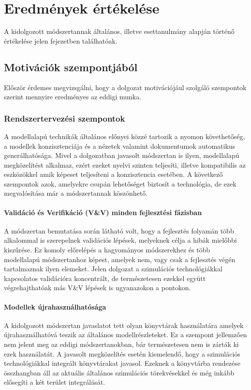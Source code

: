 \chapter{Eredmények értékelése}
A kidolgozott módszertannak általános, illetve esettanulmány alapján történő értékelése jelen fejezetben találhatóak.

    \section{Motivációk szempontjából}
    Először érdemes megvizsgálni, hogy a dolgozat motivációjául szolgáló szempontok szerint mennyire eredményes az eddigi munka.

        \subsection{Rendszertervezési szempontok}
        A modellalapú technikák általános előnyei közzé tartozik a nyomon követhetőség, a modellek konzisztenciája és a nézetek valamint dokumentumok automatikus generálhatósága.
        Mivel a dolgozatban javasolt módszertan is ilyen, modellalapú megközelítést alkalmaz, ezért ezeket nyelvi szinten teljesíti, illetve kompatibilis az eszközökkel amik képeset teljesíteni a konzisztencia esetében.
        A következő szempontok azok, amelyekre csupán lehetőséget biztosít a technológia, de ezek megvalósítása már a módszertannak köszönhető.

            \subsubsection{Validáció és Verifikáció (V\&V) minden fejlesztési fázisban} \label{ertekelesVV}
            A módszertan bemutatása során látható volt, hogy a fejlesztés folyamán több alkalommal is szerepelnek validációs lépések, melyeknek célja a hibák mielőbbi kiszűrése.
            Ez komoly előrelépés a hagyományos módszerekhez és több modellalapú módszertanhoz képest, amelyek nem, vagy csak a fejlesztés végén tartalmaznak ilyen elemeket. \cite{autoEEsystemEngineer2024}
            Jelen dolgozat a szimulációs technológiákkal kapcsolatos validációra koncentrált, de természetesen ezekkel együtt végrehajthatóak más V\&V lépések is ugyanazokon a pontokon.

            \subsubsection{Modellek újrahasználhatósága}
            A kidolgozott módszertan javaslatot tett olyan könyvtárak használatára amelyek újrahasználhatóvá teszik az általános modellrészleteket.
            Ez a szempont jellemzően nem jelent meg az eddigi módszertanokban, bár természetesen nem is zárták ki ezek használatát. \cite{Capella2024} \cite{autoEEsystemEngineer2024} \cite{Weilkiens2020}
            A javasolt megközelítés esetén kiemelendő, hogy a szimulációs technológiákkal integrált könyvtárakat javasol. Ezeknek a könyvtárba rendezése összhangban áll az aktuális általános szimulációs törekvésekkel és még inkább elősegíti a két terület integrálását.

